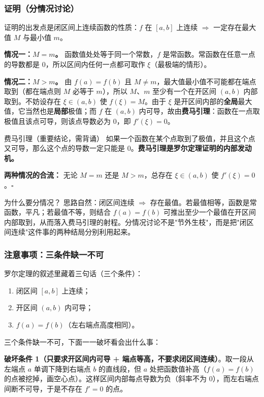 \documentclass[a4paper]{article}
\begin{document}
\subsubsection{证明（分情况讨论）}

证明的出发点是闭区间上连续函数的性质：$f$ 在 $[a,b]$ 上连续 $\Rightarrow$ 一定存在最大值 $M$ 与最小值 $m$。

\textbf{情况一：$M=m$。} 函数值处处等于同一个常数，$f$ 是常函数。常函数在任意一点的导数都是 0，所以区间内任何一点都可取作 $\xi$（最极端的情形）。

\textbf{情况二：$M>m$。} 由 $f(a)=f(b)$ 且 $M\neq m$，最大值最小值不可能都在端点取到（都在端点则 $M$ 必等于 $m$），所以 $M$、$m$ 至少有一个在开区间 $(a,b)$ 内部取到。不妨设存在 $\xi\in(a,b)$ 使 $f(\xi)=M$。由于 $\xi$ 是开区间内部的\textbf{全局}最大值，它当然也是\textbf{局部}极值；而 $f$ 在 $(a,b)$ 内可导，故由\textbf{费马引理}：函数在一点取极值且该点可导，则该点导数必为 0，即 $f'(\xi)=0$。

\begin{importantbox}{费马引理（重要结论，需背诵）}
如果一个函数在某个点取到了极值，并且这个点又可导，那么这个点的导数一定只能是 0。\textbf{费马引理是罗尔定理证明的内部发动机。}
\end{importantbox}

\textbf{两种情况的合流：} 无论 $M=m$ 还是 $M>m$，总存在 $\xi\in(a,b)$ 使 $f'(\xi)=0$。$\square$

\begin{knowledgebox}{为什么要分情况？}
思路自然：闭区间连续 $\Rightarrow$ 存在最值。若最值相等，函数是常函数，平凡；若最值不等，则结合 $f(a)=f(b)$ 可推出至少一个最值在开区间内部取到，从而落入费马引理的射程。分情况讨论不是"节外生枝"，而是把"闭区间连续"这件事的两种结局分别利用起来。
\end{knowledgebox}

\subsubsection{注意事项：三条件缺一不可}

罗尔定理的叙述里藏着三句话（三个条件）：
\begin{enumerate}
\item 闭区间 $[a,b]$ 上连续；
\item 开区间 $(a,b)$ 内可导；
\item $f(a)=f(b)$（左右端点高度相同）。
\end{enumerate}
三个条件缺一不可，下面一一破坏看会出什么事：

\textbf{破坏条件 1（只要求开区间内可导 + 端点等高，不要求闭区间连续）}。取一段从左端点 $a$ 单调下降到右端点 $b$ 的直线段，但 $a$ 处把函数值补高（$f(a)=f(b)$ 的点被挖掉，画空心点）。这样区间内部每点导数为负（斜率不为 0），而左右端点间断不可导，于是不存在 $f'=0$ 的点。
\end{document}
